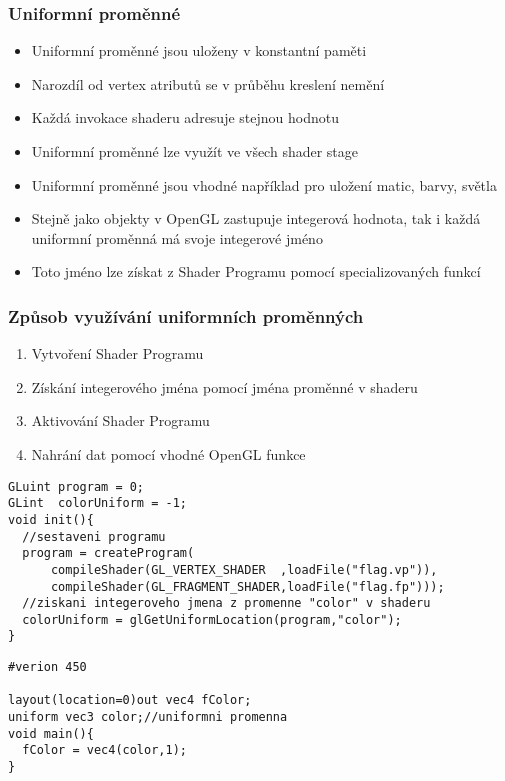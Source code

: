 
\begin{frame}[fragile]
\frametitle{Uniformní proměnné}
  \begin{itemize}
  \item Uniformní proměnné jsou uloženy v konstantní paměti
  \item Narozdíl od vertex atributů se v průběhu kreslení nemění
  \item Každá invokace shaderu adresuje stejnou hodnotu
  \item Uniformní proměnné lze využít ve všech shader stage
  \item Uniformní proměnné jsou vhodné například pro uložení matic, barvy, světla
  \item Stejně jako objekty v OpenGL zastupuje integerová hodnota, tak i každá uniformní proměnná má svoje integerové jméno
  \item Toto jméno lze získat z Shader Programu pomocí specializovaných funkcí
  \end{itemize}
\end{frame}

\begin{frame}[fragile]
\frametitle{Způsob využívání uniformních proměnných}
  \begin{enumerate}
  \item Vytvoření Shader Programu
  \item Získání integerového jména pomocí jména proměnné v shaderu
  \item Aktivování Shader Programu
  \item Nahrání dat pomocí vhodné OpenGL funkce
  \end{enumerate}
{\scriptsize
\begin{verbatim}
GLuint program = 0;
GLint  colorUniform = -1;
void init(){
  //sestaveni programu
  program = createProgram(
      compileShader(GL_VERTEX_SHADER  ,loadFile("flag.vp")),
      compileShader(GL_FRAGMENT_SHADER,loadFile("flag.fp")));
  //ziskani integeroveho jmena z promenne "color" v shaderu
  colorUniform = glGetUniformLocation(program,"color");
}
\end{verbatim}
}
{\scriptsize
\begin{verbatim}
#verion 450

layout(location=0)out vec4 fColor;
uniform vec3 color;//uniformni promenna
void main(){
  fColor = vec4(color,1);
}
\end{verbatim}
}
\end{frame}


